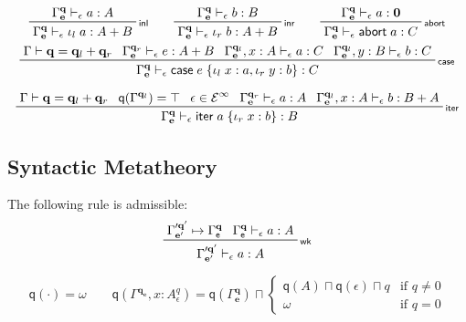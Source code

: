 \documentclass[acmsmall,screen,review]{acmart}
\newcommand{\mc}[1]{\ensuremath{\mathcal{#1}}}
\newcommand{\mb}[1]{\ensuremath{\mathbf{#1}}}
\newcommand{\ms}[1]{\ensuremath{\mathsf{#1}}}
\newcommand{\lto}{:}
\newcommand{\linl}[1]{\iota_l\;{#1}}
\newcommand{\linr}[1]{\iota_r\;{#1}}
\newcommand{\labort}[1]{\ms{abort}\;{#1}}
\newcommand{\caseexpr}[5]{\ms{case}\;#1\;\{\linl{#2} \lto #3, \linr{#4} \lto #5\}}
\newcommand{\liter}[3]{\ms{iter}\;#1\;\{ \linr{#2} \lto #3 \}}
\newcommand{\einf}[1]{#1 \in \mc{E}^\infty}
\newcommand{\qsp}[4]{#1 \vdash #2 = #3 + #4}
\newcommand{\cwk}[2]{#1 \mapsto #2}
\newcommand{\rle}[1]{{\scriptsize\textsf{#1}}}
\newcommand{\hasty}[4]{#1 \vdash_{#2} #3: {#4}}
\newcommand{\topq}{\omega}
\newcommand{\alquant}{\ms{q}}
\begin{document}
\begin{gather*}
  \prftree[r]{\rle{inl}}
    {\hasty{\Gamma^{\mb{q}}_{\mb{e}}}{\epsilon}{a}{A}}
    {\hasty{\Gamma^{\mb{q}}_{\mb{e}}}{\epsilon}{\linl{a}}{A + B}} \qquad
  \prftree[r]{\rle{inr}}
    {\hasty{\Gamma^{\mb{q}}_{\mb{e}}}{\epsilon}{b}{B}}
    {\hasty{\Gamma^{\mb{q}}_{\mb{e}}}{\epsilon}{\linr{b}}{A + B}} \qquad    
  \prftree[r]{\rle{abort}}
    {\hasty{\Gamma^{\mb{q}}_{\mb{e}}}{\epsilon}{a}{\mb{0}}}
    {\hasty{\Gamma^{\mb{q}}_{\mb{e}}}{\epsilon}{\labort{a}}{C}}
    \\
  \prftree[r]{\rle{case}}{\qsp{\Gamma}{\mb{q}}{\mb{q}_l}{\mb{q}_r}}
    {\hasty{\Gamma^{\mb{q}_r}_{\mb{e}}}{\epsilon}{e}{A + B}}
    {\hasty{\Gamma^{\mb{q}_l}_{\mb{e}}, x : A}{\epsilon}{a}{C}}
    {\hasty{\Gamma^{\mb{q}_l}_{\mb{e}}, y : B}{\epsilon}{b}{C}}
    {\hasty{\Gamma^{\mb{q}}_{\mb{e}}}{\epsilon}{\caseexpr{e}{x}{a}{y}{b}}{C}} \\
\end{gather*}


\begin{gather*}
  \prftree[r]{\rle{iter}}
    {\qsp{\Gamma}{\mb{q}}{\mb{q}_l}{\mb{q}_r}}
    {\alquant(\Gamma^{\mb{q}_l}) = \top}
    {\einf{\epsilon}}
    {\hasty{\Gamma^{\mb{q}_r}_{\mb{e}}}{\epsilon}{a}{A}}
    {\hasty{\Gamma^{\mb{q}_l}_{\mb{e}}, x : A}{\epsilon}{b}{B + A}}
    {\hasty{\Gamma^{\mb{q}}_{\mb{e}}}{\epsilon}{\liter{a}{x}{b}}{B}} \\
\end{gather*}

\subsection{Syntactic Metatheory}

\begin{lemma}[name=Weakening, restate=synmonwk]
  The following rule is admissible:
  \begin{equation*}
    \prftree[r]{\rle{wk}}
      {\cwk{\Gamma'^{\mb{q}'}_{\mb{e}'}}{\Gamma^{\mb{q}}_{\ms{e}}}}
      {\hasty{\Gamma^{\mb{q}}_{\ms{e}}}{\epsilon}{a}{A}}
      {\hasty{\Gamma'^{\mb{q}'}_{\mb{e}'}}{\epsilon}{a}{A}}
  \end{equation*}
\end{lemma}

\begin{equation*}
  \alquant(\cdot) = \topq \qquad
  \alquant(\Gamma^{\mb{q}_{\mb{e}}}, x : A^q_\epsilon) 
    = \alquant(\Gamma^{\mb{q}}_{\mb{e}}) \sqcap \begin{cases}
    \alquant(A) \sqcap \alquant(\epsilon) \sqcap q & \text{if } q \neq 0 \\
    \topq & \text{if } q = 0
  \end{cases}
\end{equation*}
\end{document}
